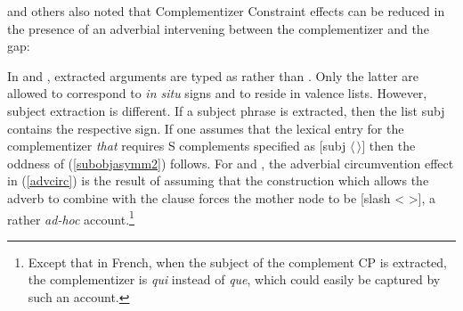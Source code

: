 \documentclass[output=paper
	        ,collection
	        ,collectionchapter
 	        ,biblatex
                ,babelshorthands
                ,newtxmath
                ,draftmode
                ,colorlinks, citecolor=brown
]{langscibook}
\begin{document}
\eal   \label{subobjasymm2}
\zl



\noindent
\citet{Bresnan:77} and others also noted that  Complementizer Constraint effects can be
reduced in the presence of an adverbial intervening between the complementizer and the gap:

\eal \label{advcirc}
\zl

\noindent
In \citet{bouma} and \citet{ginzsag}, extracted arguments are typed as  rather than . Only the latter are allowed to correspond to \emph{in situ} signs and to reside in valence lists. However, subject extraction is different. If a subject phrase is extracted, then the list {\sc subj} contains the respective  sign. If one assumes that the lexical entry for the complementizer \emph{that} requires  S complements specified as $[${\sc subj} $\langle \, \rangle]$ then the oddness of  (\ref{subobjasymm2}) follows. For  \citet{bouma} and \citet{ginzsag}, the adverbial circumvention effect in (\ref{advcirc}) is the result of assuming that the construction which allows the adverb to combine with the clause forces the mother node to be [{\sc slash} < >], a rather \emph{ad-hoc} account.\footnote{Except that in French, when the subject of the complement CP is extracted, the complementizer is {\it qui} instead of {\it que}, which could easily be captured by such an account.}
\end{document}
